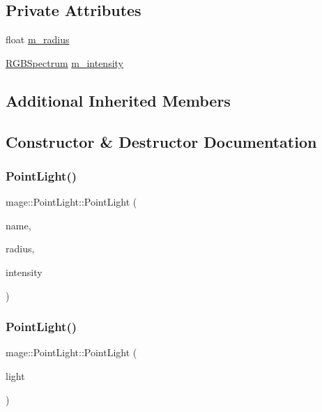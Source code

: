 \subsection*{Private Attributes}
\begin{DoxyCompactItemize}
\item 
float \hyperlink{classmage_1_1_point_light_a04459adec2eaadc457799e4399b5df1f}{m\+\_\+radius}
\item 
\hyperlink{structmage_1_1_r_g_b_spectrum}{R\+G\+B\+Spectrum} \hyperlink{classmage_1_1_point_light_ac021a08c4c700c3b19de5f7491a80e4f}{m\+\_\+intensity}
\end{DoxyCompactItemize}
\subsection*{Additional Inherited Members}


\subsection{Constructor \& Destructor Documentation}
\hypertarget{classmage_1_1_point_light_ac9d479055720799816d0489669cbd986}{}\label{classmage_1_1_point_light_ac9d479055720799816d0489669cbd986} 
\subsubsection{\texorpdfstring{Point\+Light()}{PointLight()}\hspace{0.1cm}{\footnotesize\ttfamily [1/3]}}
{\footnotesize\ttfamily mage\+::\+Point\+Light\+::\+Point\+Light (\begin{DoxyParamCaption}\item[{const string}]{name,  }\item[{float}]{radius,  }\item[{const \hyperlink{structmage_1_1_r_g_b_spectrum}{R\+G\+B\+Spectrum} \&}]{intensity }\end{DoxyParamCaption})}

\hypertarget{classmage_1_1_point_light_abc6ba4557ef81adbd1540de21698a2c8}{}\label{classmage_1_1_point_light_abc6ba4557ef81adbd1540de21698a2c8} 
\subsubsection{\texorpdfstring{Point\+Light()}{PointLight()}\hspace{0.1cm}{\footnotesize\ttfamily [2/3]}}
{\footnotesize\ttfamily mage\+::\+Point\+Light\+::\+Point\+Light (\begin{DoxyParamCaption}\item[{const \hyperlink{classmage_1_1_point_light}{Point\+Light} \&}]{light }\end{DoxyParamCaption})\hspace{0.3cm}{\ttfamily [default]}}

